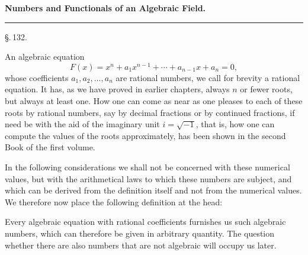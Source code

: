 \begin{center}

\textbf{Numbers and Functionals of an Algebraic Field.}

\rule{4cm}{0.4pt}
\end{center}

\begin{center}
\S.\,132.

\end{center}

An algebraic equation
\[
F(x) = x^n + a_1 x^{n-1} + \cdots + a_{n-1} x + a_n = 0,
\]
whose coefficients $a_1, a_2, \ldots, a_n$ are rational numbers, we call for brevity a rational equation. It has, as we have proved in earlier chapters, always $n$ or fewer roots, but always at least one. How one can come as near as one pleases to each of these roots by rational numbers, say by decimal fractions or by continued fractions, if need be with the aid of the imaginary unit $i = \sqrt{-1}$, that is, how one can compute the values of the roots approximately, has been shown in the second Book of the first volume.

In the following considerations we shall not be concerned with these numerical values, but with the arithmetical laws to which these numbers are subject, and which can be derived from the definition itself and not from the numerical values. We therefore now place the following definition at the head:


Every algebraic equation with rational coefficients furnishes us such algebraic numbers, which can therefore be given in arbitrary quantity. The question whether there are also numbers that are not algebraic will occupy us later.
